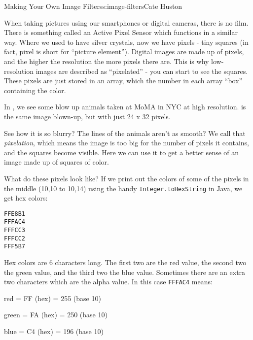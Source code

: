 \begin{aosachapter}{Making Your Own Image Filters}{s:image-filters}{Cate Huston}
\label{photographs-the-digital-way}

When taking pictures using our smartphones or digital cameras, there is
no film. There is something called an Active Pixel Sensor which
functions in a similar way. Where we used to have silver crystals, now
we have pixels - tiny squares (in fact, pixel is short for ``picture
element''). Digital images are made up of pixels, and the higher the
resolution the more pixels there are. This is why low-resolution images
are described as ``pixelated'' - you can start to see the squares. These
pixels are just stored in an array, which the number in each array
``box'' containing the color.

In , we see some blow up animals
taken at MoMA in NYC at high resolution.
 is the same image blown-up,
but with just 24 x 32 pixels.



See how it is so blurry? The lines of the animals aren't as smooth? We
call that \emph{pixelation}, which means the image is too big for the
number of pixels it contains, and the squares become visible. Here we
can use it to get a better sense of an image made up of squares of
color.

What do these pixels look like? If we print out the colors of some of
the pixels in the middle (10,10 to 10,14) using the handy
\texttt{Integer.toHexString} in Java, we get hex colors:

\begin{verbatim}
FFE8B1
FFFAC4
FFFCC3
FFFCC2
FFF5B7
\end{verbatim}

Hex colors are 6 characters long. The first two are the red value, the
second two the green value, and the third two the blue value. Sometimes
there are an extra two characters which are the alpha value. In this
case \texttt{FFFAC4} means:

\begin{aosaitemize}

\item
  red = FF (hex) = 255 (base 10)
\item
  green = FA (hex) = 250 (base 10)
\item
  blue = C4 (hex) = 196 (base 10)
\end{aosaitemize}


\end{aosachapter}
